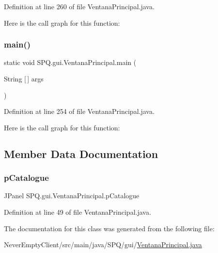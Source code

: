 Definition at line 260 of file Ventana\+Principal.\+java.

Here is the call graph for this function\+:
\mbox{\label{class_s_p_q_1_1gui_1_1_ventana_principal_a48fb869f7efb018079dac708ed20f7d3}} 
\subsubsection{\texorpdfstring{main()}{main()}}
{\footnotesize\ttfamily static void S\+P\+Q.\+gui.\+Ventana\+Principal.\+main (\begin{DoxyParamCaption}\item[{String \mbox{[}$\,$\mbox{]}}]{args }\end{DoxyParamCaption})\hspace{0.3cm}{\ttfamily [static]}}



Definition at line 254 of file Ventana\+Principal.\+java.

Here is the call graph for this function\+:


\subsection{Member Data Documentation}
\mbox{\label{class_s_p_q_1_1gui_1_1_ventana_principal_a0835e35fdf5ad82ba10366336f5fbdb4}} 
\subsubsection{\texorpdfstring{p\+Catalogue}{pCatalogue}}
{\footnotesize\ttfamily J\+Panel S\+P\+Q.\+gui.\+Ventana\+Principal.\+p\+Catalogue}



Definition at line 49 of file Ventana\+Principal.\+java.



The documentation for this class was generated from the following file\+:\begin{DoxyCompactItemize}
\item 
Never\+Empty\+Client/src/main/java/\+S\+P\+Q/gui/\mbox{\hyperlink{_ventana_principal_8java}{Ventana\+Principal.\+java}}\end{DoxyCompactItemize}

